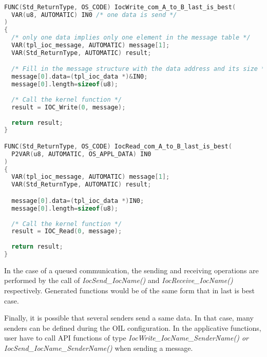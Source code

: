 \begin{lstlisting}[language=C]

FUNC(Std_ReturnType, OS_CODE) IocWrite_com_A_to_B_last_is_best(
  VAR(u8, AUTOMATIC) IN0 /* one data is send */
)
{
  /* only one data implies only one element in the message table */
  VAR(tpl_ioc_message, AUTOMATIC) message[1]; 
  VAR(Std_ReturnType, AUTOMATIC) result;

  /* Fill in the message structure with the data address and its size */
  message[0].data=(tpl_ioc_data *)&IN0;
  message[0].length=sizeof(u8);
  
  /* Call the kernel function */
  result = IOC_Write(0, message); 
  
  return result;
}

FUNC(Std_ReturnType, OS_CODE) IocRead_com_A_to_B_last_is_best(
  P2VAR(u8, AUTOMATIC, OS_APPL_DATA) IN0
)
{
  VAR(tpl_ioc_message, AUTOMATIC) message[1];
  VAR(Std_ReturnType, AUTOMATIC) result;

  message[0].data=(tpl_ioc_data *)IN0;
  message[0].length=sizeof(u8);
  
  /* Call the kernel function */
  result = IOC_Read(0, message);
  
  return result;
}

\end{lstlisting}


In the case of a queued communication, the sending and receiving operations are performed by the call of \textit{IocSend_IocName()} and \textit{IocReceive_IocName()} respectively. Generated functions would be of the same form that in last is best case.

Finally, it is possible that several senders send a same data. In that case, many senders can be defined during the OIL configuration. In the applicative functions, user have to call API functions of type \textit{IocWrite_IocName_SenderName() or IocSend_IocName_SenderName()} when sending a message.